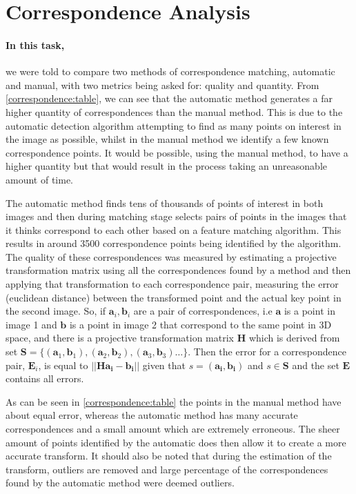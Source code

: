 \documentclass[10pt,twocolumn,letterpaper]{article}
\begin{document}
\section{Correspondence Analysis}

\paragraph{In this task,} we were told to compare two methods of correspondence matching, automatic and manual, with two metrics being asked for: quality and quantity. From \autoref{correspondence:table}, we can see that the automatic method generates a far higher quantity of correspondences than the manual method. This is due to the automatic detection algorithm attempting to find as many points on interest in the image as possible, whilst in the manual method we identify a few known correspondence points. It would be possible, using the manual method, to have a higher quantity but that would result in the process taking an unreasonable amount of time. 

The automatic method finds tens of thousands of points of interest in both images and then during matching stage selects pairs of points in the images that it thinks correspond to each other based on a feature matching algorithm. This results in around 3500 correspondence points being identified by the algorithm. The quality of these correspondences was measured by estimating a projective transformation matrix using all the correspondences found by a method and then applying that transformation to each correspondence pair, measuring the error (euclidean distance) between the transformed point and the actual key point in the second image. So, if $\mathbf{a}_i, \mathbf{b}_i$ are a pair of correspondences, i.e $\mathbf{a}$ is a point in image 1 and $\mathbf{b}$ is a point in image 2 that correspond to the same point in 3D space, and there is a projective transformation matrix $\mathbf{H}$ which is derived from set $\mathbf{S} = \{(\mathbf{a}_1, \mathbf{b}_1), (\mathbf{a}_2, \mathbf{b}_2), (\mathbf{a}_3, \mathbf{b}_3) \dots\} $. Then the error for a correspondence pair, $\mathbf{E}_i$, is equal to $||\mathbf{Ha_i} - \mathbf{b_i}|| $ given that $ s = (\mathbf{a_i}, \mathbf{b_i}) $ and $ s \in \mathbf{S}$ and the set $\mathbf{E}$ contains all errors.

As can be seen in \autoref{correspondence:table} the points in the manual method have about equal error, whereas the automatic method has many accurate correspondences and a small amount which are extremely erroneous. The sheer amount of points identified by the automatic does then allow it to create a more accurate transform. It should also be noted that during the estimation of the transform, outliers are removed and large percentage of the correspondences found by the automatic method were deemed outliers.
\end{document}
